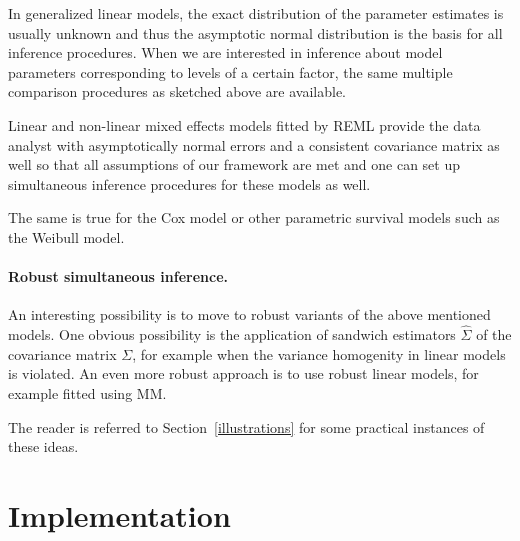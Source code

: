\documentclass[12pt]{article}
\begin{document}
In generalized linear models, the exact distribution of the parameter estimates
is usually unknown and thus the asymptotic normal distribution is the basis for all
inference procedures. When we are interested in inference about model
parameters corresponding to levels of a certain factor, the same multiple 
comparison procedures as sketched above are available. 

Linear and non-linear mixed effects models fitted by REML provide
the data analyst with asymptotically normal errors and a consistent
covariance matrix as well so that all assumptions of our framework
are met and one can set up simultaneous inference procedures
for these models as well.

The same is true for the Cox model or other parametric survival models
such as the Weibull model.

\paragraph{Robust simultaneous inference.}

An interesting possibility is to move to robust variants of the above
mentioned models. One obvious possibility is the application
of sandwich estimators $\hat{\Sigma}$ of the covariance matrix $\Sigma$, 
for example when the variance homogenity in linear models is violated.
An even more robust approach is to use robust linear models, for example
fitted using MM.

The reader is referred to Section~\ref{illustrations} for some practical
instances of these ideas.

\section{Implementation}







\end{document}
